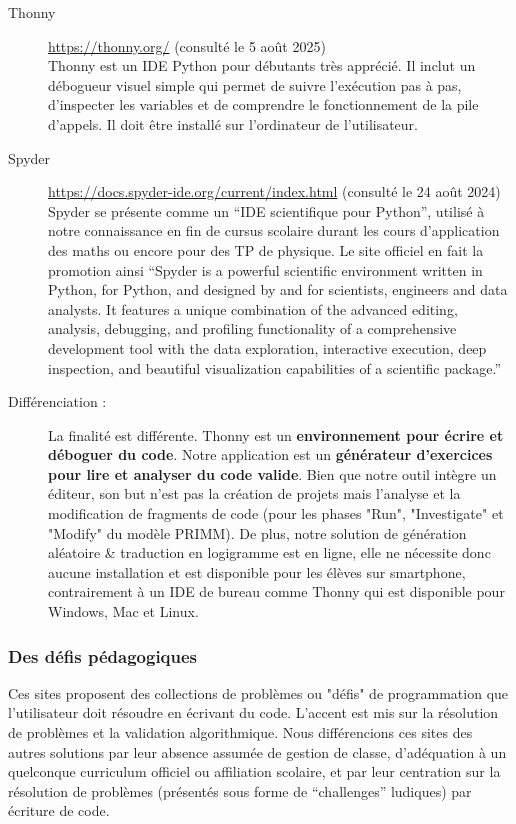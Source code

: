 \documentclass[11pt,a4paper]{article}
\begin{document}
\begin{description}
    \item[Thonny] \url{https://thonny.org/} (consulté le 5 août 2025) \\
    Thonny est un IDE Python pour débutants très apprécié. Il inclut un débogueur visuel simple qui permet de suivre l'exécution pas à pas, d'inspecter les variables et de comprendre le fonctionnement de la pile d'appels. Il doit être installé sur l'ordinateur de l'utilisateur.
     \item[Spyder] \url{https://docs.spyder-ide.org/current/index.html} (consulté le 24 août 2024)\\
     Spyder se présente comme un ``IDE scientifique pour Python'', utilisé à notre connaissance en fin de cursus scolaire durant les cours d'application des maths ou encore pour des TP de physique. Le site officiel en fait la promotion ainsi ``Spyder is a powerful scientific environment written in Python, for Python, and designed by and for scientists, engineers and data analysts. It features a unique combination of the advanced editing, analysis, debugging, and profiling functionality of a comprehensive development tool with the data exploration, interactive execution, deep inspection, and beautiful visualization capabilities of a scientific package.''
     
    \item[Différenciation :] La finalité est différente. Thonny est un \textbf{environnement pour écrire et déboguer du code}. Notre application est un \textbf{générateur d'exercices pour lire et analyser du code valide}. Bien que notre outil intègre un éditeur, son but n'est pas la création de projets mais l'analyse et la modification de fragments de code (pour les phases "Run", "Investigate" et "Modify" du modèle PRIMM). De plus, notre solution de génération aléatoire \& traduction en logigramme est en ligne, elle ne nécessite donc aucune installation et est disponible pour les élèves sur smartphone, contrairement à un IDE de bureau comme Thonny qui est disponible pour Windows, Mac et Linux.
\end{description}

\subsubsection{Des défis pédagogiques}
Ces sites proposent des collections de problèmes ou "défis" de programmation que l'utilisateur doit résoudre en écrivant du code. L'accent est mis sur la résolution de problèmes et la validation algorithmique. Nous différencions ces sites des autres solutions par leur absence assumée de gestion de classe, d'adéquation à un quelconque curriculum officiel ou affiliation scolaire, et par leur centration sur la résolution de problèmes (présentés sous forme de ``challenges'' ludiques) par écriture de code.
\end{document}
